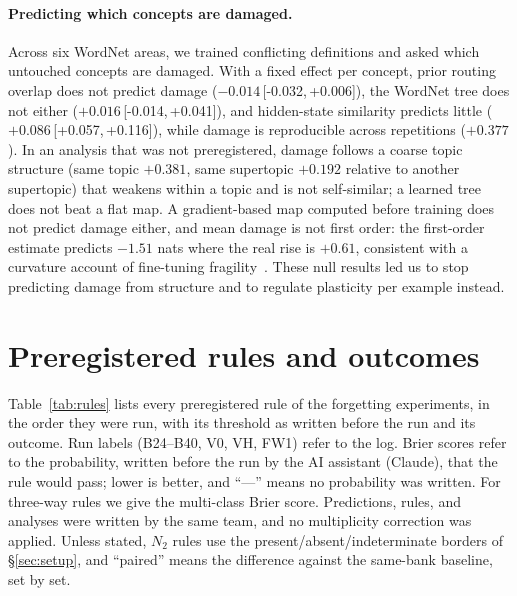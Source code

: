 \documentclass[11pt]{article}
\newcommand{\NTwo}{\ensuremath{N_2}}
\newcommand{\ci}[2]{\,[#1,\,#2]}
\begin{document}
\paragraph{Predicting which concepts are damaged.}
Across six WordNet areas, we trained conflicting definitions and asked which untouched concepts are damaged.
With a fixed effect per concept, prior routing overlap does not predict damage ($-0.014$\ci{-0.032}{+0.006}), the WordNet tree does not either ($+0.016$\ci{-0.014}{+0.041}), and hidden-state similarity predicts little ($+0.086$\ci{+0.057}{+0.116}), while damage is reproducible across repetitions ($+0.377$).
In an analysis that was not preregistered, damage follows a coarse topic structure (same topic $+0.381$, same supertopic $+0.192$ relative to another supertopic) that weakens within a topic and is not self-similar; a learned tree does not beat a flat map.
A gradient-based map computed before training does not predict damage either, and mean damage is not first order: the first-order estimate predicts $-1.51$ nats where the real rise is $+0.61$, consistent with a curvature account of fine-tuning fragility~\citep{dimitrov2026loss}.
These null results led us to stop predicting damage from structure and to regulate plasticity per example instead.

\section{Preregistered rules and outcomes}
\label{app:rules}

Table~\ref{tab:rules} lists every preregistered rule of the forgetting experiments, in the order they were run, with its threshold as written before the run and its outcome.
Run labels (B24--B40, V0, VH, FW1) refer to the log.
Brier scores refer to the probability, written before the run by the AI assistant (Claude), that the rule would pass; lower is better, and ``---'' means no probability was written.
For three-way rules we give the multi-class Brier score.
Predictions, rules, and analyses were written by the same team, and no multiplicity correction was applied.
Unless stated, \NTwo{} rules use the present/absent/indeterminate borders of \S\ref{sec:setup}, and ``paired'' means the difference against the same-bank baseline, set by set.
\end{document}
